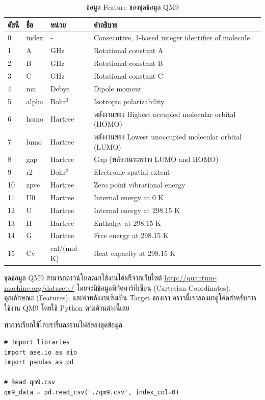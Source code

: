 \begin{table}[H]
    \centering
    \caption{ข้อมูล Feature ของชุดข้อมูล QM9}
    \label{tab:qm9_feature}
    \small
    \begin{tabular}{llll}\toprule
    \textbf{ดัชนี} &\textbf{ชื่อ} &\textbf{หน่วย} &\textbf{คำอธิบาย} \\\midrule
    0 &index &- &Consecutive, 1-based integer identifier of molecule \\
    1 &A &GHz &Rotational constant A \\
    2 &B &GHz &Rotational constant B \\
    3 &C &GHz &Rotational constant C \\
    4 &mu &Debye &Dipole moment \\
    5 &alpha &Bohr$^3$ &Isotropic polarizability \\
    6 &homo &Hartree &พลังงานของ Highest occupied molecular orbital (HOMO) \\
    7 &lumo &Hartree &พลังงานของ Lowest unoccupied molecular orbital (LUMO) \\
    8 &gap &Hartree &Gap (พลังงานระหว่าง LUMO and HOMO) \\
    9 &r2 &Bohr$^2$ &Electronic spatial extent \\
    10 &zpve &Hartree &Zero point vibrational energy \\
    11 &U0 &Hartree &Internal energy at 0 K \\
    12 &U &Hartree &Internal energy at 298.15 K \\
    13 &H &Hartree &Enthalpy at 298.15 K \\
    14 &G &Hartree &Free energy at 298.15 K \\
    15 &Cv &cal/(mol K) &Heat capacity at 298.15 K \\
    \bottomrule
    \end{tabular}
\end{table}

ชุดข้อมูล QM9 สามารถดาวน์โหลดมาใช้งานได้ฟรีจากเว็บไซต์ \url{http://quantum-machine.org/datasets/} โดยจะมีข้อมูลพิกัดคาร์ทีเซียน
(Cartesian Coordinates), คุณลักษณะ (Features), และค่าพลังงานซึ่งเป็น Target ของเรา คราวนี้เราลองมาดูโค้ดสำหรับการใช้งาน 
QM9 โดยใช้ Python ตามด้านล่างนี้เลย

\noindent ทำการเรียกใช้ไลบรารี่และอ่านไฟล์ของชุดข้อมูล
\begin{lstlisting}[style=MyPython]
# Import libraries
import ase.io as aio
import pandas as pd

# Read qm9.csv
qm9_data = pd.read_csv('./qm9.csv', index_col=0)
\end{lstlisting}

